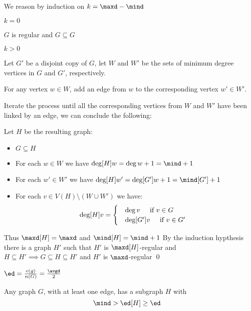 \begin{prf}
    We reason by induction on $k = \maxd - \mind$

    \boldmath $k = 0$ \unboldmath

    $G$ is regular and $G \subseteq G$
    
    \boldmath $k > 0$ \unboldmath

    Let $G'$ be a disjoint copy of $G$, let $W$ and $W'$ be the sets of minimum degree vertices in $G$ and $G'$, respectively.

    For any vertex $w \in W$, add an edge from $w$ to the corresponding vertex $w' \in W'$.

    Iterate the process until all the corresponding vertices from $W$ and $W'$ have been linked by an edge, we can conclude the following:

    Let $H$ be the resulting graph:
    \begin{itemize}
        \item $G \subseteq H$
        \item For each $w \in W$ we have $\deg[H]{w} = \deg{w} + 1 = \mind + 1$
        \item For each $w' \in W'$ we have $\deg[H]{w'} = \deg[G']{w} + 1 = \mind[G'] + 1$
        \item For each $v \in V(H) \setminus (W \cup W')$ we have:
        \begin{equation*}
            \deg[H]{v} =
            \begin{cases}
                &\deg{v} \text{\hspace{5mm}if } v \in G\\
                &\deg[G']{v} \text{\hspace{5mm}if } v \in G'
            \end{cases}
        \end{equation*}
    \end{itemize}
    Thus $\maxd[H] = \maxd$ and $\mind[H] = \mind + 1$
    By the induction hypthesis there is a graph $H'$ such that $H'$ is $\maxd[H]$-regular and $H \subseteq H' \implies G \subseteq H \subseteq H'$ and $H'$ is $\maxd$-regular \qed
\end{prf}
\begin{definition}
    $\ed = \frac{e(g)}{n(G)} = \frac{\avgd}{2}$
\end{definition}
\begin{proposition}
    Any graph $G$, with at least one edge, has a subgraph $H$ with
    \begin{equation*}
        \mind > \ed[H] \geq \ed
    \end{equation*}
\end{proposition}

